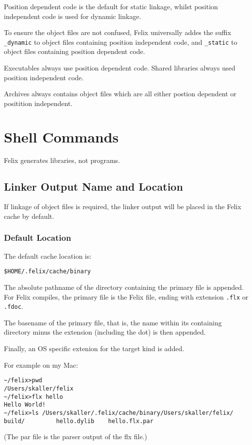 \documentclass[oneside]{book}
\begin{document}
Position dependent code is the default for static linkage,
whilst position independent code is used for dynamic linkage.

To ensure the object files are not confused, Felix universally
addes the suffix \verb$_dynamic$ to object files containing
position independent code, and \verb$_static$ to object files
containing position dependent code.

Executables always use position dependent code.
Shared libraries always used position independent code.

Archives always contains object files which are all either
postion dependent or positition independent.

\chapter{Shell Commands}
Felix generates libraries, not programs.

\section{Linker Output Name and Location}
If linkage of object files is required, the linker output
will be placed in the Felix cache by default.

\subsection{Default Location}
The default cache location is:
\begin{verbatim}
$HOME/.felix/cache/binary
\end{verbatim}

The absolute pathname of the directory containing
the primary file is appended. For Felix compiles,
the primary file is the Felix file, ending with
extension \verb$.flx$ or \verb$.fdoc$.

The basename of the primary file, that is, the
name within its containing directory minus
the extension (including the dot) is then appended.

Finally, an OS specific extenion for the target kind
is added. 

For example on my Mac:
\begin{verbatim}
~/felix>pwd
/Users/skaller/felix
~/felix>flx hello
Hello World!
~/felix>ls /Users/skaller/.felix/cache/binary/Users/skaller/felix/
build/         hello.dylib    hello.flx.par
\end{verbatim}
(The par file is the parser output of the flx file.)
\end{document}
